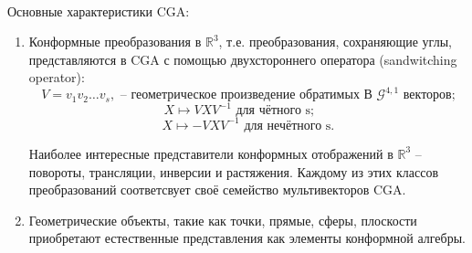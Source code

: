 \documentclass[12pt]{article}
\begin{document}
\paragraph{}
Основные характеристики CGA:
\begin{enumerate}
    \item Конформные преобразования в $\mathds{R}^{3}$, т.е. преобразования, сохраняющие углы, представляются в CGA с помощью двухстороннего оператора (sandwitching operator):
    $$ V = v_1v_2\dots v_s, \text{ -- геометрическое произведение обратимых В } \mathcal{G}^{4,1} \text{ векторов;}$$
    $$ X \mapsto VXV^{-1} \text{ для чётного s;} \quad \ \ $$
    $$ X \mapsto - VXV^{-1} \text{ для нечётного s.} $$
    
    Наиболее интересные представители конформных отображений в  $\mathds{R}^3$ -- повороты, трансляции, инверсии и растяжения. Каждому из этих классов преобразований соответсвует своё семейство мультивекторов CGA. 
    \item Геометрические объекты, такие как точки, прямые, сферы, плоскости приобретают естественные представления как элементы конформной алгебры.
\end{enumerate}
\end{document}
